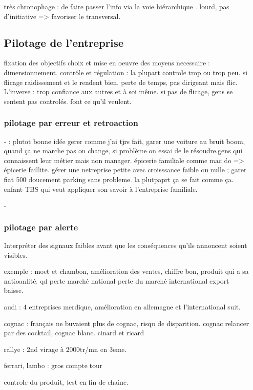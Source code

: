 \documentclass[a4paper,12pt]{article}
\begin{document}
très chronophage : de faire passer l'info via la voie hiérarchique .
lourd, pas d'initiative 
=> favoriser le transversal.

\subsection{Pilotage de l'entreprise}

fixation des objectifs
choix et mise en oeuvre des moyens necessaire : dimensionnement.
contrôle et régulation : la plupart controle trop ou trop peu. si flicage raidissement et le rendent bien, perte
de temps, pas dirigeant mais flic. L'inverse : trop confiance aux autres et à soi même. si pas de flicage, 
gens se sentent pas controlés. font ce qu'il veulent.


\subsubsection{pilotage par erreur et retroaction }
- : plutot bonne idée
gerer comme j'ai tjrs fait, garer une voiture au bruit boom, quand ça ne marche pas on change,
si problème on essai de le résoudre.gens qui connaissent leur métier mais non manager. épicerie familiale
comme mac do => épicerie faillite. 
gérer une netreprise petite avec croisssance faible ou nulle ; garer fiat 500 doucement parking sans probleme.
la plutpaprt ça se fait comme ça. enfant TBS qui veut appliquer son savoir à l'entreprise familiale.




-\subsubsection{pilotage par alerte} 
Interpréter des signaux faibles avant que les conséquences qu'ils annoncent soient visibles.

exemple : moet et chambon, amélioration des ventes, chiffre bon, produit qui a sa natioanlité.
qd perte marché national perte du marché international export baisse.

audi : 4 entreprises merdique, amélioration en allemagne et l'international suit.

cognac : français ne buvaient plus de cognac, risqu de disparition.
cognac relancer par des cocktail, cognac blanc.
cinard et ricard


rallye : 2nd virage à 2000tr/mn en 3eme.

ferrari, lambo : gros compte tour 

controle du produit, test en fin de chaine.
\end{document}
